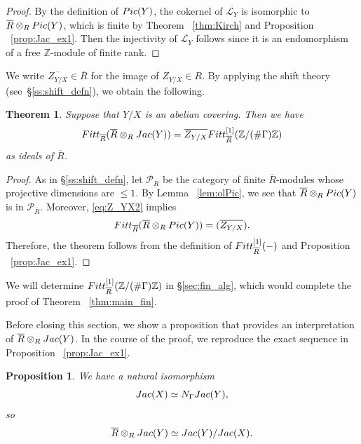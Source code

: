 \documentclass[11pt]{article}
\newtheorem{thm}[theo]{Theorem}
\newtheorem{prop}[theo]{Proposition}
\theoremstyle{definition}
\numberwithin{equation}{section}
\newcommand{\Z}{\mathbb{Z}}
\newcommand{\cL}{\mathcal{L}}
\newcommand{\cP}{\mathcal{P}}
\newcommand{\ol}[1]{\overline{#1}}
\newcommand{\Pic}{{\rm Pic}}
\newcommand{\Jac}{{\rm Jac}}
\newcommand{\Fitt}{{\rm Fitt}}
\begin{document}
\begin{proof}
By the definition of $\Pic(Y)$, the cokernel of $\ol{\cL_Y}$ is isomorphic to $\ol{R} \otimes_R \Pic(Y)$, which is finite by Theorem ~\ref{thm:Kirch} and Proposition ~\ref{prop:Jac_ex1}.
Then the injectivity of $\ol{\cL_Y}$ follows since it is an endomorphism of a free $\Z$-module of finite rank.
\end{proof}

We write $\ol{Z_{Y/X}} \in \ol{R}$ for the image of $Z_{Y/X} \in R$.
By applying the shift theory (see~\S\ref{ss:shift_defn}), we obtain the following.

\begin{thm}\label{thm:Fitt_fin1}
Suppose that $Y/X$ is an abelian covering.
Then we have
\[
\Fitt_{\ol{R}}(\ol{R} \otimes_R \Jac(Y))
= \ol{Z_{Y/X}} \Fitt^{[1]}_{\ol{R}}(\Z/ (\#\Gamma) \Z)
\]
as ideals of $\ol{R}$.
\end{thm}

\begin{proof}
As in \S\ref{ss:shift_defn}, let $\cP_{\ol{R}}$ be the category of finite $\ol{R}$-modules whose projective dimensions are $\leq 1$.
By Lemma ~\ref{lem:olPic}, we see that $\ol{R} \otimes_R \Pic(Y)$ is in $\cP_{\ol{R}}$.
Moreover, \eqref{eq:Z_YX2} implies
\[
\Fitt_{\ol{R}}(\ol{R} \otimes_R \Pic(Y)) 
= (\ol{Z_{Y/X}}).
\]
Therefore, the theorem follows from the definition of $\Fitt^{[1]}_{\ol{R}}(-)$ and Proposition ~\ref{prop:Jac_ex1}.
\end{proof}

We will determine $\Fitt^{[1]}_{\ol{R}}(\Z/ (\#\Gamma) \Z)$ in \S\ref{sec:fin_alg}, which would complete the proof of Theorem ~\ref{thm:main_fin}.

Before closing this section, we show a proposition that provides an interpretation of $\ol{R} \otimes_R \Jac(Y)$.
In the course of the proof, we reproduce the exact sequence in Proposition ~\ref{prop:Jac_ex1}.

\begin{prop}\label{prop:NormY}
We have a natural isomorphism
\[
\Jac(X) \simeq N_{\Gamma} \Jac(Y),
\]
so
\[
\ol{R} \otimes_R \Jac(Y) 
\simeq \Jac(Y)/\Jac(X).
\]
\end{prop}
\end{document}
